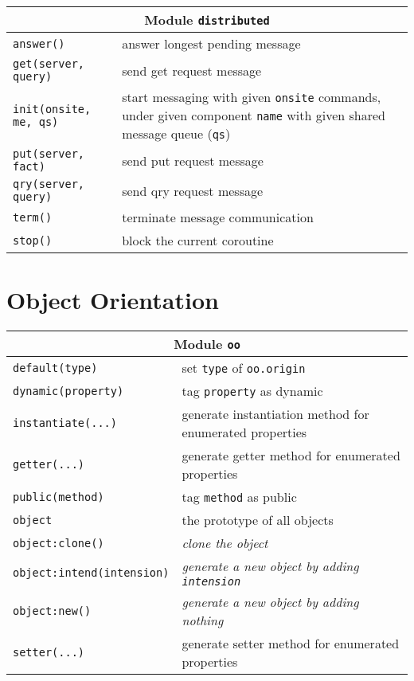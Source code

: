 \begin{appendices}
\begin{table}[H]
\begin{tabular}{|p{5cm}|p{8cm}|}
\hline
\multicolumn{2}{|c|}{Module \texttt{distributed}}\\
\hline
\hline
\texttt{answer()} & answer longest pending message \\
\hline
\texttt{get(server, query)} & send get request message \\
\hline
\texttt{init(onsite, me, qs)} & start messaging with given \texttt{onsite} commands, under given component \texttt{name} with given shared message queue (\texttt{qs})\\
\hline
\texttt{put(server, fact)} & send put request message \\
\hline
\texttt{qry(server, query)} & send qry request message \\
\hline
\texttt{term()} & terminate message communication \\
\hline
\texttt{stop()} & block the current coroutine \\
\hline
\end{tabular}
\end{table}


\section{Object Orientation}

\begin{table}[H]
\begin{tabular}{|p{5cm}|p{8cm}|}
\hline
\multicolumn{2}{|c|}{Module \texttt{oo}}\\
\hline
\hline
\texttt{default(type)} & set \texttt{type} of \texttt{oo.origin} \\
\hline
\texttt{dynamic(property)} & tag \texttt{property} as dynamic \\
\hline
\texttt{instantiate(...)} & generate instantiation method for enumerated properties \\
\hline
\texttt{getter(...)} & generate getter method for enumerated properties \\
\hline
\texttt{public(method)} & tag \texttt{method} as public \\
\hline
\texttt{object} & the prototype of all objects \\
\hline
\texttt{object:clone()} & \emph{clone the object} \\
\hline
\texttt{object:intend(intension)} & \emph{generate a new object by adding \texttt{intension}}\\
\hline
\texttt{object:new()} & \emph{generate a new object by adding nothing} \\
\hline
\texttt{setter(...)} & generate setter method for enumerated properties \\
\hline
\end{tabular}
\end{table}


\end{appendices}
